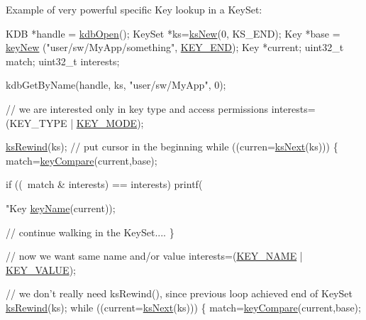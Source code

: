 \begin{DoxyParagraph}{Example of very powerful specific Key lookup in a Key\-Set\-:}

\begin{DoxyCode}
KDB *handle = \hyperlink{group__kdb_ga6808defe5870f328dd17910aacbdc6ca}{kdbOpen}();
KeySet *ks=\hyperlink{group__keyset_ga671e1aaee3ae9dc13b4834a4ddbd2c3c}{ksNew}(0, KS\_END);
Key *base = \hyperlink{group__key_gad23c65b44bf48d773759e1f9a4d43b89}{keyNew} (\textcolor{stringliteral}{"user/sw/MyApp/something"}, \hyperlink{group__key_gga91fb3178848bd682000958089abbaf40aa8adb6fcb92dec58fb19410eacfdd403}{KEY\_END});
Key *current;
uint32\_t match;
uint32\_t interests;


kdbGetByName(handle, ks, \textcolor{stringliteral}{"user/sw/MyApp"}, 0);

\textcolor{comment}{// we are interested only in key type and access permissions}
interests=(KEY\_TYPE | \hyperlink{group__key_gga91fb3178848bd682000958089abbaf40a1b0a91ff3a855d6993930ebf0abaa518}{KEY\_MODE});

\hyperlink{group__keyset_gabe793ff51f1728e3429c84a8a9086b70}{ksRewind}(ks);   \textcolor{comment}{// put cursor in the beginning}
\textcolor{keywordflow}{while} ((curren=\hyperlink{group__keyset_ga317321c9065b5a4b3e33fe1c399bcec9}{ksNext}(ks))) \{
        match=\hyperlink{group__keytest_gab98168409d302fdb65692f6e26f17945}{keyCompare}(current,base);
        
        \textcolor{keywordflow}{if} ((~match & interests) == interests)
                printf(\textcolor{stringliteral}{"Key %
      \hyperlink{group__keyname_ga8e805c726a60da921d3736cda7813513}{keyName}(current));

        \textcolor{comment}{// continue walking in the KeySet....}
\}

\textcolor{comment}{// now we want same name and/or value}
interests=(\hyperlink{group__key_gga91fb3178848bd682000958089abbaf40ad6127fc38f96410bf7c8f6e93b0397da}{KEY\_NAME} | \hyperlink{group__key_gga91fb3178848bd682000958089abbaf40ac66e4a49d09212b79f5754ca6db5bd2e}{KEY\_VALUE});

\textcolor{comment}{// we don't really need ksRewind(), since previous loop achieved end of KeySet}
\hyperlink{group__keyset_gabe793ff51f1728e3429c84a8a9086b70}{ksRewind}(ks);
\textcolor{keywordflow}{while} ((current=\hyperlink{group__keyset_ga317321c9065b5a4b3e33fe1c399bcec9}{ksNext}(ks))) \{
        match=\hyperlink{group__keytest_gab98168409d302fdb65692f6e26f17945}{keyCompare}(current,base);

}
\end{DoxyCode}
\end{DoxyParagraph}
